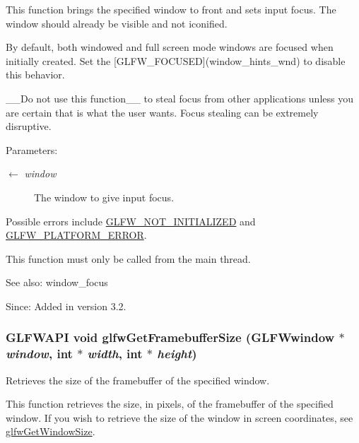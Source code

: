This function brings the specified window to front and sets input focus. The window should already be visible and not iconified.

By default, both windowed and full screen mode windows are focused when initially created. Set the \mbox{[}GLFW\_\-FOCUSED\mbox{]}(window\_\-hints\_\-wnd) to disable this behavior.

\_\-\_\-Do not use this function\_\-\_\- to steal focus from other applications unless you are certain that is what the user wants. Focus stealing can be extremely disruptive.

\begin{Desc}
\item[Parameters:]
\begin{description}
\item[\mbox{$\leftarrow$} {\em window}]The window to give input focus.\end{description}
\end{Desc}
Possible errors include \hyperlink{group__errors_g2374ee02c177f12e1fa76ff3ed15e14a}{GLFW\_\-NOT\_\-INITIALIZED} and \hyperlink{group__errors_gd44162d78100ea5e87cdd38426b8c7a1}{GLFW\_\-PLATFORM\_\-ERROR}.

This function must only be called from the main thread.

\begin{Desc}
\item[See also:]window\_\-focus\end{Desc}
\begin{Desc}
\item[Since:]Added in version 3.2. \end{Desc}
\hypertarget{group__window_gf7d17f3534b4b6dc9a6f905e3a240b7e}{
\subsubsection[glfwGetFramebufferSize]{\setlength{\rightskip}{0pt plus 5cm}GLFWAPI void glfwGetFramebufferSize ({\bf GLFWwindow} $\ast$ {\em window}, \/  int $\ast$ {\em width}, \/  int $\ast$ {\em height})}}
\label{group__window_gf7d17f3534b4b6dc9a6f905e3a240b7e}


Retrieves the size of the framebuffer of the specified window. 

This function retrieves the size, in pixels, of the framebuffer of the specified window. If you wish to retrieve the size of the window in screen coordinates, see \hyperlink{group__window_g7feb769ebb3f3d21579b5a3fb07be76e}{glfwGetWindowSize}.

